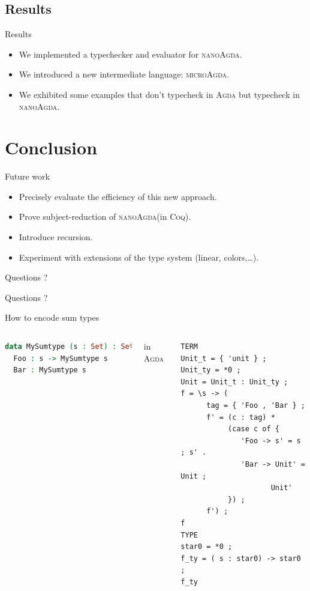 \documentclass[xcolor=svgnames,11pt]{beamer}
\newcommand{\coq}{\textsc{Coq}\xspace}
\newcommand{\agda}{\textsc{Agda}\xspace}
\newcommand{\ma}{\textsc{microAgda}\xspace}
\newcommand{\na}{\textsc{nanoAgda}\xspace}
\begin{document}
\subsection{Results}
\begin{frame}{Results}
\begin{itemize}
\item We implemented a typechecker and evaluator for \na.
\item We introduced a new intermediate language: \ma.
\item We exhibited some examples that don't typecheck in \agda but typecheck in \na.
\end{itemize}
\end{frame}

\section{Conclusion}
\begin{frame}{Future work}
\begin{itemize}
\item Precisely evaluate the efficiency of this new approach.
\item Prove subject-reduction of \na (in \coq).
\item Introduce recursion.
\item Experiment with extensions of the type system (linear, colors,\dots).
\end{itemize}
\end{frame}

\begin{frame}[plain]
  \begin{center}
    \Huge Questions ?
  \end{center}
\end{frame}


\begin{frame}[plain]
  \begin{center}
    \Huge Questions ?
  \end{center}
\end{frame}






\begin{frame}[fragile]{How to encode sum types}
\begin{columns}
\begin{lstlisting}[language=Agda]
data MySumtype (s : Set) : Set where
  Foo : s -> MySumtype s
  Bar : MySumtype s
\end{lstlisting}
\centering in \agda
{}\pause
\begin{lstlisting}[basicstyle=\scriptsize\ttfamily,language=nanoAgda]
TERM
Unit_t = { 'unit } ;
Unit_ty = *0 ;
Unit = Unit_t : Unit_ty ;
f = \s -> (
      tag = { 'Foo , 'Bar } ;
      f' = (c : tag) *
           (case c of {
              'Foo -> s' = s ; s' .
              'Bar -> Unit' = Unit ;
                     Unit'
           }) ;
      f') ;
f
TYPE
star0 = *0 ;
f_ty = ( s : star0) -> star0 ;
f_ty
\end{lstlisting}
\end{columns}
\end{frame}
\end{document}
